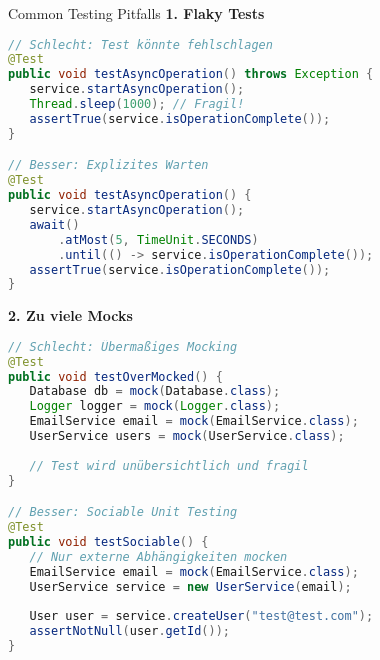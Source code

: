 \begin{example2}{Common Testing Pitfalls}
\textbf{1. Flaky Tests}
\begin{lstlisting}[language=Java, style=basesmol]
// Schlecht: Test könnte fehlschlagen
@Test
public void testAsyncOperation() throws Exception {
   service.startAsyncOperation();
   Thread.sleep(1000); // Fragil!
   assertTrue(service.isOperationComplete());
}

// Besser: Explizites Warten
@Test
public void testAsyncOperation() {
   service.startAsyncOperation();
   await()
       .atMost(5, TimeUnit.SECONDS)
       .until(() -> service.isOperationComplete());
   assertTrue(service.isOperationComplete());
}
\end{lstlisting}

\textbf{2. Zu viele Mocks}
\begin{lstlisting}[language=Java, style=basesmol]
// Schlecht: Übermaßiges Mocking
@Test
public void testOverMocked() {
   Database db = mock(Database.class);
   Logger logger = mock(Logger.class);
   EmailService email = mock(EmailService.class);
   UserService users = mock(UserService.class);
   
   // Test wird unübersichtlich und fragil
}

// Besser: Sociable Unit Testing
@Test
public void testSociable() {
   // Nur externe Abhängigkeiten mocken
   EmailService email = mock(EmailService.class);
   UserService service = new UserService(email);
   
   User user = service.createUser("test@test.com");
   assertNotNull(user.getId());
}
\end{lstlisting}
\end{example2}

